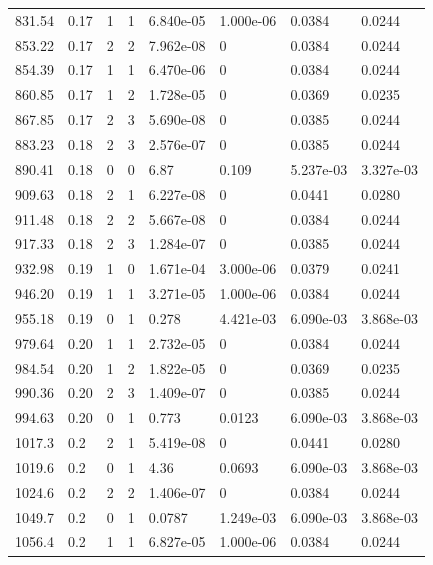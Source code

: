 \documentclass[preview]{standalone}
\begin{document}
{{{\begin{tabular}{L{1.2cm}C{1.2cm} C{0.3cm}C{0.5cm} C{1.4cm}C{1.4cm} C{1.4cm}C{1.4cm}}
  831.54  &  0.17  & 1     &  1 &  6.840e-05  & 1.000e-06  & 0.0384 &  0.0244   \\ 
  853.22  &  0.17  & 2     &  2 &  7.962e-08  & 0  & 0.0384 &  0.0244   \\ 
  854.39  &  0.17  & 1     &  1 &  6.470e-06  & 0  & 0.0384 &  0.0244   \\ 
  860.85  &  0.17  & 1     &  2 &  1.728e-05  & 0  & 0.0369 &  0.0235   \\ 
  867.85  &  0.17  & 2     &  3 &  5.690e-08  & 0  & 0.0385 &  0.0244   \\ 
  883.23  &  0.18  & 2     &  3 &  2.576e-07  & 0  & 0.0385 &  0.0244   \\ 
  890.41  &  0.18  & 0     &  0 &  6.87  & 0.109  & 5.237e-03 &  3.327e-03   \\ 
  909.63  &  0.18  & 2     &  1 &  6.227e-08  & 0  & 0.0441 &  0.0280   \\ 
  911.48  &  0.18  & 2     &  2 &  5.667e-08  & 0  & 0.0384 &  0.0244   \\ 
  917.33  &  0.18  & 2     &  3 &  1.284e-07  & 0  & 0.0385 &  0.0244   \\ 
  932.98  &  0.19  & 1     &  0 &  1.671e-04  & 3.000e-06  & 0.0379 &  0.0241   \\ 
  946.20  &  0.19  & 1     &  1 &  3.271e-05  & 1.000e-06  & 0.0384 &  0.0244   \\ 
  955.18  &  0.19  & 0     &  1 &  0.278  & 4.421e-03  & 6.090e-03 &  3.868e-03   \\ 
  979.64  &  0.20  & 1     &  1 &  2.732e-05  & 0  & 0.0384 &  0.0244   \\ 
  984.54  &  0.20  & 1     &  2 &  1.822e-05  & 0  & 0.0369 &  0.0235   \\ 
  990.36  &  0.20  & 2     &  3 &  1.409e-07  & 0  & 0.0385 &  0.0244   \\ 
  994.63  &  0.20  & 0     &  1 &  0.773  & 0.0123  & 6.090e-03 &  3.868e-03   \\ 
  1017.3  &   0.2  & 2     &  1 &  5.419e-08  & 0  & 0.0441 &  0.0280   \\ 
  1019.6  &   0.2  & 0     &  1 &  4.36  & 0.0693  & 6.090e-03 &  3.868e-03   \\ 
  1024.6  &   0.2  & 2     &  2 &  1.406e-07  & 0  & 0.0384 &  0.0244   \\ 
  1049.7  &   0.2  & 0     &  1 &  0.0787  & 1.249e-03  & 6.090e-03 &  3.868e-03   \\ 
  1056.4  &   0.2  & 1     &  1 &  6.827e-05  & 1.000e-06  & 0.0384 &  0.0244   \\ 

\end{tabular}}}}
\end{document}
